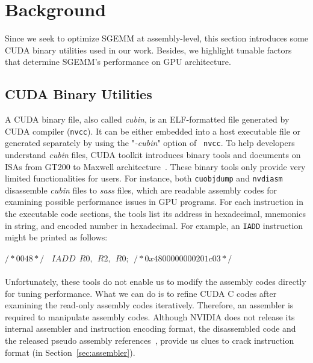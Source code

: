 \section{Background}
\label{sec:background}
Since we seek to optimize SGEMM at assembly-level, this section introduces some CUDA binary utilities used in our work. 
Besides, we highlight tunable factors that determine SGEMM's performance on GPU architecture.

\subsection{CUDA Binary Utilities}
\label{sec:cuda}

A CUDA binary file, also called {\em cubin}, is an ELF-formatted file generated by CUDA compiler ({\tt nvcc}). It can 
be either embedded into a host executable file or generated separately by using the "{\em -cubin}" option of {\tt 
nvcc}. To help developers understand {\em cubin} files, CUDA toolkit introduces binary tools and documents on ISAs from 
GT200 to Maxwell architecture~\cite{gtx980}. These binary tools only provide very limited functionalities for users. 
For instance, both {\tt cuobjdump} and {\tt nvdiasm} disassemble {\em cubin} files to {\em sass} files, which are 
readable assembly codes for examining possible performance issues in GPU programs. For each instruction in the 
executable code sections, the tools list its address in hexadecimal, mnemonics in string, and encoded number in 
hexadecimal. For example, an {\tt IADD} instruction might be printed as follows: \\\\
$/*0048*/~~~~IADD~~R0,~~R2,~~R0;~~/* 0x4800000000201c03 */$\\\\
Unfortunately, these tools do not enable us to modify the assembly codes directly for tuning performance. What we can 
do is to refine CUDA C codes after examining the read-only assembly codes iteratively. Therefore, an assembler is 
required to manipulate assembly codes. Although NVIDIA does not release its internal assembler and instruction encoding 
format, the disassembled code and the released pseudo assembly references~\cite{ptx2015isa}, provide us clues to crack 
instruction format (in Section~\ref{sec:assembler}).


